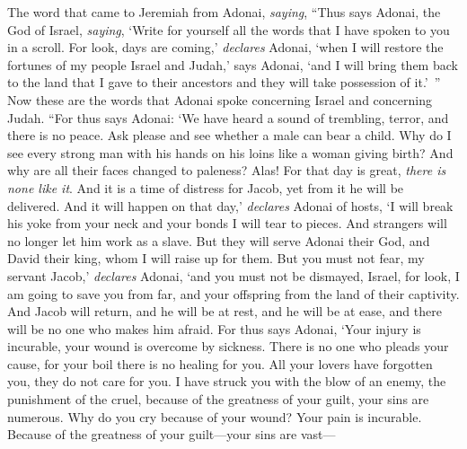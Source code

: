 \begin{biblechapter} %
 The word that came to Jeremiah from Adonai, \textit{saying},
\verse “Thus says Adonai, the God of Israel, \textit{saying}, ‘Write for yourself all the words that I have spoken to you in a scroll.
\verse For look, days are coming,’ \textit{declares} Adonai, ‘when I will restore the fortunes of my people Israel and Judah,’ says Adonai, ‘and I will bring them back to the land that I gave to their ancestors and they will take possession of it.’ ”
\verse Now these are the words that Adonai spoke concerning Israel and concerning Judah.
\verse “For thus says Adonai:
\verse ‘We have heard a sound of trembling, 
terror, and there is no peace.
\verse Ask please and see whether a male can bear a child. 
Why do I see every strong man 
with his hands on his loins like a woman giving birth? 
And why are all their faces changed to paleness?
\verse Alas! For that day is great, 
\textit{there is none like it}. 
And it is a time of distress for Jacob, 
yet from it he will be delivered.
\verse And it will happen on that day,’ \textit{declares} Adonai of hosts, 
‘I will break his yoke from your neck 
and your bonds I will tear to pieces. 
And strangers will no longer let him work as a slave.
\verse But they will serve Adonai their God, 
and David their king, whom I will raise up for them.
\verse But you must not fear, my servant Jacob,’ \textit{declares} Adonai, 
‘and you must not be dismayed, Israel, 
for look, I am going to save you from far, 
and your offspring from the land of their captivity. 
And Jacob will return, 
and he will be at rest, 
and he will be at ease, 
and there will be no one who makes him afraid.
\verse For thus says Adonai,
\verse ‘Your injury is incurable, 
your wound is overcome by sickness.
\verse There is no one who pleads your cause, 
for your boil there is no healing for you.
\verse All your lovers have forgotten you, 
they do not care for you. 
I have struck you with the blow of an enemy, 
the punishment of the cruel, 
because of the greatness of your guilt, 
your sins are numerous.
\verse Why do you cry because of your wound? 
Your pain is incurable. 
Because of the greatness of your guilt—your sins are vast— 

\end{biblechapter}
